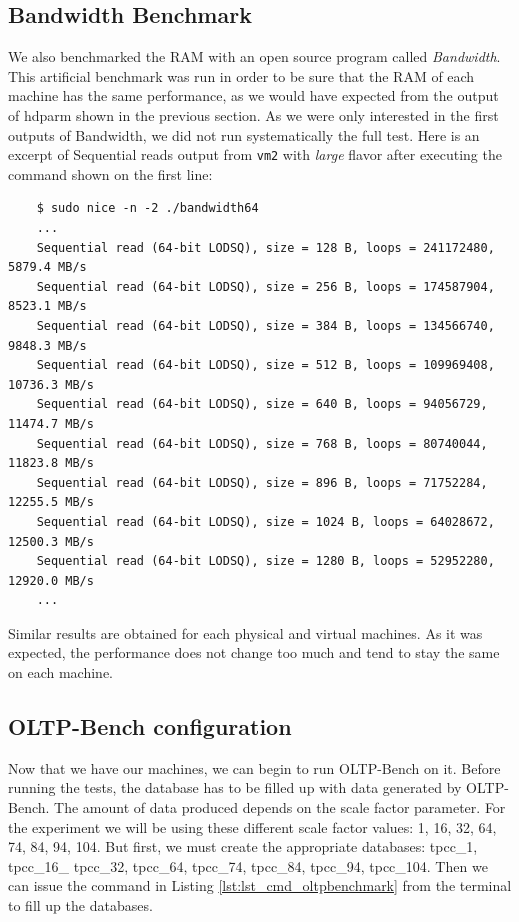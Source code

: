 \subsection{Bandwidth Benchmark}
We also benchmarked the RAM with an open source program called \textit{Bandwidth}. 
This artificial benchmark was run in order to be sure that the RAM of each machine has the same performance, as we would have expected from the output of hdparm shown in the previous section.
As we were only interested in the first outputs of Bandwidth, we did not run systematically the full test. Here is an excerpt of Sequential reads output from \texttt{vm2} with \textit{large} flavor after executing the command shown on the first line:

\begingroup
	\singlespacing
    \fontsize{10pt}{12pt}\selectfont
\begin{verbatim}
    $ sudo nice -n -2 ./bandwidth64
    ...
    Sequential read (64-bit LODSQ), size = 128 B, loops = 241172480, 5879.4 MB/s
    Sequential read (64-bit LODSQ), size = 256 B, loops = 174587904, 8523.1 MB/s
    Sequential read (64-bit LODSQ), size = 384 B, loops = 134566740, 9848.3 MB/s
    Sequential read (64-bit LODSQ), size = 512 B, loops = 109969408, 10736.3 MB/s
    Sequential read (64-bit LODSQ), size = 640 B, loops = 94056729, 11474.7 MB/s
    Sequential read (64-bit LODSQ), size = 768 B, loops = 80740044, 11823.8 MB/s
    Sequential read (64-bit LODSQ), size = 896 B, loops = 71752284, 12255.5 MB/s
    Sequential read (64-bit LODSQ), size = 1024 B, loops = 64028672, 12500.3 MB/s
    Sequential read (64-bit LODSQ), size = 1280 B, loops = 52952280, 12920.0 MB/s
    ...
\end{verbatim}
\endgroup

Similar results are obtained for each physical and virtual machines. 
As it was expected, the performance does not change too much and tend to stay the same on each machine.

\subsection{OLTP-Bench configuration}
\label{sec:oltpb_config}
Now that we have our machines, we can begin to run OLTP-Bench on it. 
Before running the tests, the database has to be filled up with data generated by OLTP-Bench. 
The amount of data produced depends on the scale factor parameter.
For the experiment we will be using these different scale factor values: 1, 16, 32, 64, 74, 84, 94, 104. 
But first, we must create the appropriate databases: tpcc\_1, tpcc\_16\_ tpcc\_32, tpcc\_64, tpcc\_74, tpcc\_84, tpcc\_94, tpcc\_104. 
Then we can issue the command in Listing \ref{lst:lst_cmd_oltpbenchmark} from the terminal to fill up the databases.

